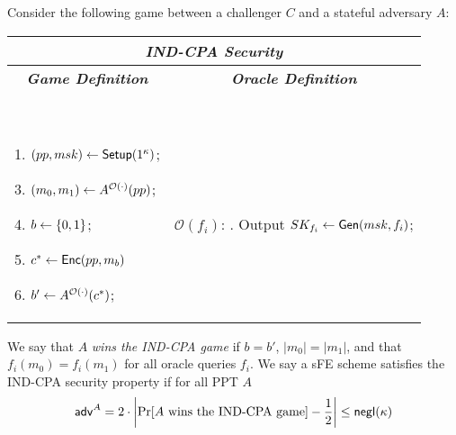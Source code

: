 \documentclass{llncs}
\begin{document}
\begin{defi} \label{def:FEnoread}
Consider the following game between a challenger $C$ and a stateful adversary $A$:
\begin{center}
\begin{small}
    \begin{tabular}{| p{5.5cm} | p{5cm} |}
    \hline
	\multicolumn{2}{|c|}{\textbf{\emph{ IND-CPA Security}}} \\
	\hline
	\multicolumn{1}{|c|}{\textbf{\emph{Game Definition}}} & \multicolumn{1}{|c|}{\textbf{\emph{Oracle Definition}}}  \\
	\hline
	\
	
	1. $(pp,msk)\leftarrow \mathsf{Setup}(1^\kappa)$;

	3. $(m_0,m_1) \leftarrow A^{\mathcal{O}(\cdot)}(pp)$;
	
	4. $b\leftarrow \{0,1\}$;

	5. $c^* \leftarrow \mathsf{Enc}(pp,m_b)$
	
	6. $b' \leftarrow A^{\mathcal{O}(\cdot)}(c^*)$;

	&
	\

	$\mathcal{O}(f_i)$: \newline 1. Output $SK_{f_i} \leftarrow \mathsf{Gen}(msk,f_i)$;

	\\
	\hline
	\end{tabular}
\end{small}
\end{center}
We say that $A$ \emph{wins the IND-CPA game} if $b=b'$, $|m_0|=|m_1|$, and that $f_i(m_0) = f_i(m_1)$ for all oracle queries $f_i$.
We say a sFE scheme satisfies the IND-CPA security property if for all PPT $A$
$$
\mathsf{adv}^{A} = 2\cdot \left|\Pr[A \mbox{ wins the IND-CPA game}]-\frac{1}{2}\right|\leq \mathsf{negl}(\kappa)
$$ 
\end{defi}
\end{document}
